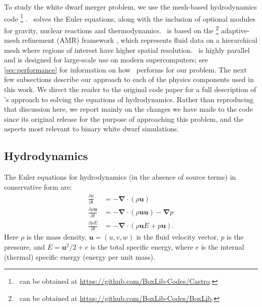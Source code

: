 \documentclass[12pt]{article}
\begin{document}
To study the white dwarf merger problem, we use the mesh-based
hydrodynamics code \castro\footnote{\castro\ can be obtained at
\url{https://github.com/BoxLib-Codes/Castro}.} \citep{castro}.
\castro\ solves the Euler equations, along with the inclusion of optional modules for gravity,
nuclear reactions and thermodynamics. \castro\ is based on the \boxlib
\footnote{\boxlib\ can be obtained at \url{https://github.com/BoxLib-Codes/BoxLib}.}
adaptive-mesh refinement (AMR) framework \citep{rendleman:2000,boxlib-tiling}, which
represents fluid data on a hierarchical mesh where regions of interest have higher
spatial resolution. \castro\ is highly parallel and is designed for
large-scale use on modern supercomputers; see 
\autoref{sec:performance} for information on how \castro\ performs for our
problem. The next few subsections describe our approach to each of the
physics components used in this work. We direct the reader to the
original code paper for a full description of \castro's approach to
solving the equations of hydrodynamics. Rather than reproducing that
discussion here, we report mainly on the changes we have made to the
code since its original release for the purpose of approaching this problem,
and the aspects most relevant to binary white dwarf simulations.

\subsection{Hydrodynamics}
\label{sec:hydrodynamics}

The Euler equations for hydrodynamics (in the absence of source terms) in conservative form are: 
\begin{align}
  \frac{\partial \rho}{\partial t} &= -\bm{\nabla} \cdot (\rho \mathbf{u}) \label{eq:euler_density}\\
  \frac{\partial \rho \mathbf{u}}{\partial t} &= -\bm{\nabla} \cdot (\rho \mathbf{u}\mathbf{u}) - \bm{\nabla}p \label{eq:euler_momentum}\\
  \frac{\partial \rho E}{\partial t} &= -\bm{\nabla}\cdot(\rho\mathbf{u}E + p\mathbf{u}). \label{eq:euler_energy}
\end{align}
Here $\rho$ is the mass density, $\mathbf{u} = (u, v, w)$ is the fluid velocity
vector, $p$ is the pressure, and $E = \mathbf{u}^2 / 2 + e$ is the
total specific energy, where $e$ is the internal (thermal) specific
energy (energy per unit mass).
\end{document}
